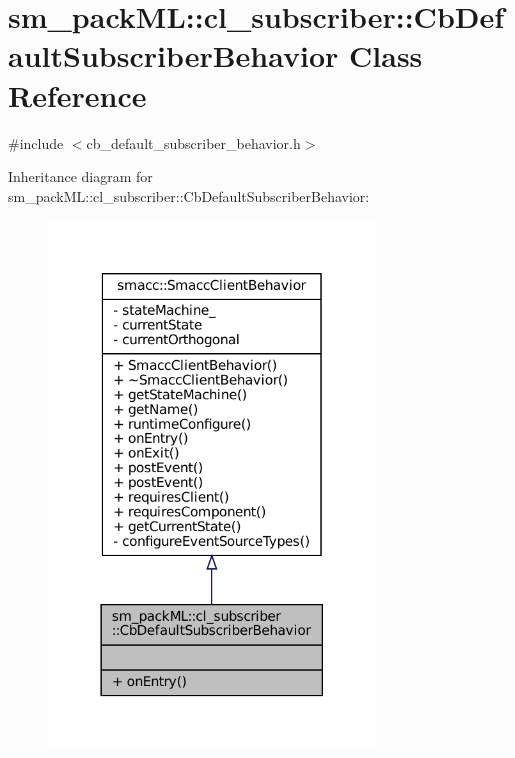 \hypertarget{classsm__packML_1_1cl__subscriber_1_1CbDefaultSubscriberBehavior}{}\section{sm\+\_\+pack\+ML\+:\+:cl\+\_\+subscriber\+:\+:Cb\+Default\+Subscriber\+Behavior Class Reference}
\label{classsm__packML_1_1cl__subscriber_1_1CbDefaultSubscriberBehavior}


{\ttfamily \#include $<$cb\+\_\+default\+\_\+subscriber\+\_\+behavior.\+h$>$}



Inheritance diagram for sm\+\_\+pack\+ML\+:\+:cl\+\_\+subscriber\+:\+:Cb\+Default\+Subscriber\+Behavior\+:
\nopagebreak
\begin{figure}[H]
\begin{center}
\leavevmode
\includegraphics[width=246pt]{classsm__packML_1_1cl__subscriber_1_1CbDefaultSubscriberBehavior__inherit__graph}
\end{center}
\end{figure}


